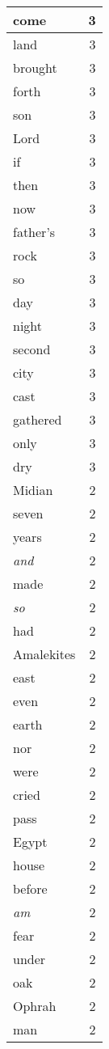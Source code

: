 \begin{center}
\begin{longtable}{l|r}
come & 3\\ \hline 
land & 3\\ \hline 
brought & 3\\ \hline 
forth & 3\\ \hline 
son & 3\\ \hline 
Lord & 3\\ \hline 
if & 3\\ \hline 
then & 3\\ \hline 
now & 3\\ \hline 
father's & 3\\ \hline 
rock & 3\\ \hline 
so & 3\\ \hline 
day & 3\\ \hline 
night & 3\\ \hline 
second & 3\\ \hline 
city & 3\\ \hline 
cast & 3\\ \hline 
gathered & 3\\ \hline 
only & 3\\ \hline 
dry & 3\\ \hline 
Midian & 2\\ \hline 
seven & 2\\ \hline 
years & 2\\ \hline 
\emph{and} & 2\\ \hline 
made & 2\\ \hline 
\emph{so} & 2\\ \hline 
had & 2\\ \hline 
Amalekites & 2\\ \hline 
east & 2\\ \hline 
even & 2\\ \hline 
earth & 2\\ \hline 
nor & 2\\ \hline 
were & 2\\ \hline 
cried & 2\\ \hline 
pass & 2\\ \hline 
Egypt & 2\\ \hline 
house & 2\\ \hline 
before & 2\\ \hline 
\emph{am} & 2\\ \hline 
fear & 2\\ \hline 
under & 2\\ \hline 
oak & 2\\ \hline 
Ophrah & 2\\ \hline 
man & 2\\ \hline 

\end{longtable}
\end{center}
